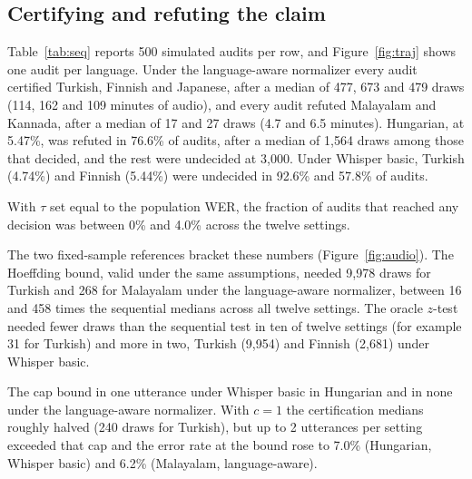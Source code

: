 \subsection{Certifying and refuting the claim}
\label{sec:results-seq}

Table~\ref{tab:seq} reports 500 simulated audits per row, and Figure~\ref{fig:traj} shows one audit per language. Under the language-aware normalizer every audit certified Turkish, Finnish and Japanese, after a median of 477, 673 and 479 draws (114, 162 and 109 minutes of audio), and every audit refuted Malayalam and Kannada, after a median of 17 and 27 draws (4.7 and 6.5 minutes). Hungarian, at 5.47\%, was refuted in 76.6\% of audits, after a median of 1{,}564 draws among those that decided, and the rest were undecided at 3{,}000. Under Whisper basic, Turkish (4.74\%) and Finnish (5.44\%) were undecided in 92.6\% and 57.8\% of audits.

With $\tau$ set equal to the population WER, the fraction of audits that reached any decision was between 0\% and 4.0\% across the twelve settings.

The two fixed-sample references bracket these numbers (Figure~\ref{fig:audio}). The Hoeffding bound, valid under the same assumptions, needed 9{,}978 draws for Turkish and 268 for Malayalam under the language-aware normalizer, between 16 and 458 times the sequential medians across all twelve settings. The oracle $z$-test needed fewer draws than the sequential test in ten of twelve settings (for example 31 for Turkish) and more in two, Turkish (9{,}954) and Finnish (2{,}681) under Whisper basic.

The cap bound in one utterance under Whisper basic in Hungarian and in none under the language-aware normalizer. With $c = 1$ the certification medians roughly halved (240 draws for Turkish), but up to 2 utterances per setting exceeded that cap and the error rate at the bound rose to 7.0\% (Hungarian, Whisper basic) and 6.2\% (Malayalam, language-aware).

